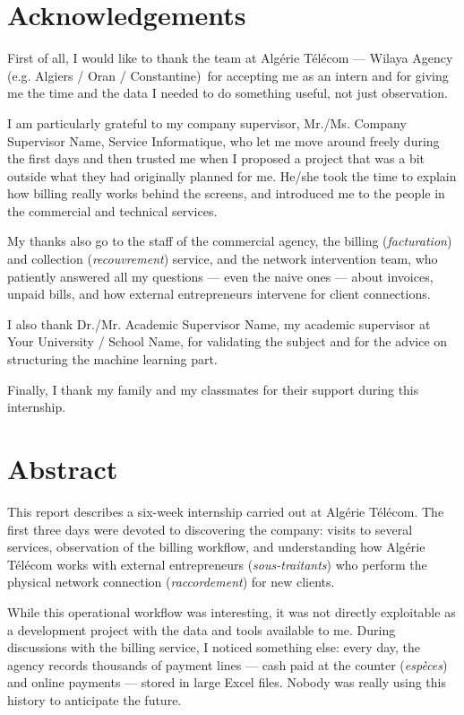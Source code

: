 \documentclass[12pt,a4paper]{report}
\newcommand{\StudentSchool}{Your University / School Name}
\newcommand{\AcademicSupervisor}{Dr./Mr. Academic Supervisor Name}
\newcommand{\CompanySupervisor}{Mr./Ms. Company Supervisor Name, Service Informatique}
\newcommand{\InternshipPlace}{Algérie Télécom --- Wilaya Agency (e.g. Algiers / Oran / Constantine)}
\begin{document}
\chapter*{Acknowledgements}

First of all, I would like to thank the team at \InternshipPlace\ for accepting me as an intern and for giving me the time and the data I needed to do something useful, not just observation.

I am particularly grateful to my company supervisor, \CompanySupervisor, who let me move around freely during the first days and then trusted me when I proposed a project that was a bit outside what they had originally planned for me. He/she took the time to explain how billing really works behind the screens, and introduced me to the people in the commercial and technical services.

My thanks also go to the staff of the commercial agency, the billing (\textit{facturation}) and collection (\textit{recouvrement}) service, and the network intervention team, who patiently answered all my questions --- even the naive ones --- about invoices, unpaid bills, and how external entrepreneurs intervene for client connections.

I also thank \AcademicSupervisor, my academic supervisor at \StudentSchool, for validating the subject and for the advice on structuring the machine learning part.

Finally, I thank my family and my classmates for their support during this internship.

\chapter*{Abstract}

This report describes a six-week internship carried out at Algérie Télécom. The first three days were devoted to discovering the company: visits to several services, observation of the billing workflow, and understanding how Algérie Télécom works with external entrepreneurs (\textit{sous-traitants}) who perform the physical network connection (\textit{raccordement}) for new clients.

While this operational workflow was interesting, it was not directly exploitable as a development project with the data and tools available to me. During discussions with the billing service, I noticed something else: every day, the agency records thousands of payment lines --- cash paid at the counter (\textit{espèces}) and online payments --- stored in large Excel files. Nobody was really using this history to anticipate the future.
\end{document}
